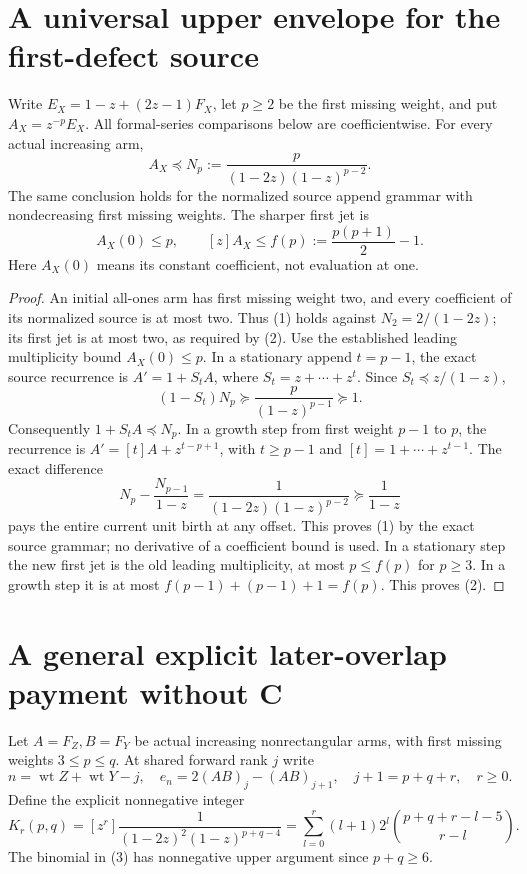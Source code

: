 \section{A universal upper envelope for the first-defect source}
Write $E_X=1-z+(2z-1)F_X$, let $p\ge2$ be the first missing
weight, and put $A_X=z^{-p}E_X$.  All formal-series comparisons
below are coefficientwise.  For every actual increasing arm,
\[
 A_X\preceq N_p:=\frac{p}{(1-2z)(1-z)^{p-2}}.             \tag{1}
\]
The same conclusion holds for the normalized source append grammar
with nondecreasing first missing weights.  The sharper first jet is
\[
 A_X(0)\le p,\qquad [z]A_X\le f(p):=\frac{p(p+1)}2-1.    \tag{2}
\]
Here $A_X(0)$ means its constant coefficient, not evaluation at one.

\begin{proof}
An initial all-ones arm has first missing weight two, and every
coefficient of its normalized source is at most two.  Thus (1)
holds against $N_2=2/(1-2z)$; its first jet is at most two, as
required by (2).  Use the established leading multiplicity bound
$A_X(0)\le p$.  In a stationary append $t=p-1$, the exact source
recurrence is $A'=1+S_tA$, where $S_t=z+\cdots+z^t$.
Since $S_t\preceq z/(1-z)$,
\[
 (1-S_t)N_p\succeq\frac{p}{(1-z)^{p-1}}\succeq1.
\]
Consequently $1+S_tA\preceq N_p$.  In a growth step from first
weight $p-1$ to $p$, the recurrence is
$A'=[t]A+z^{t-p+1}$, with $t\ge p-1$ and $[t]=1+\cdots+z^{t-1}$.
The exact difference
\[
 N_p-\frac{N_{p-1}}{1-z}
       =\frac1{(1-2z)(1-z)^{p-2}}\succeq\frac1{1-z}
\]
pays the entire current unit birth at any offset.  This proves (1)
by the exact source grammar; no derivative of a coefficient bound
is used.  In a stationary step the new first jet is the old leading
multiplicity, at most $p\le f(p)$ for $p\ge3$.  In a growth step
it is at most $f(p-1)+(p-1)+1=f(p)$.  This proves (2).
\end{proof}

\section{A general explicit later-overlap payment without C}
Let $A=F_Z,B=F_Y$ be actual increasing nonrectangular arms, with
first missing weights $3\le p\le q$.  At shared forward rank $j$
write
\[
 n=\operatorname{wt}Z+\operatorname{wt}Y-j,\quad
 e_n=2(AB)_j-(AB)_{j+1},\quad j+1=p+q+r,\quad r\ge0.
\]
Define the explicit nonnegative integer
\[
 K_r(p,q)=[z^r]\frac1{(1-2z)^2(1-z)^{p+q-4}}
  =\sum_{l=0}^r(l+1)2^l\binom{p+q+r-l-5}{r-l}.       \tag{3}
\]
The binomial in (3) has nonnegative upper argument since $p+q\ge6$.

